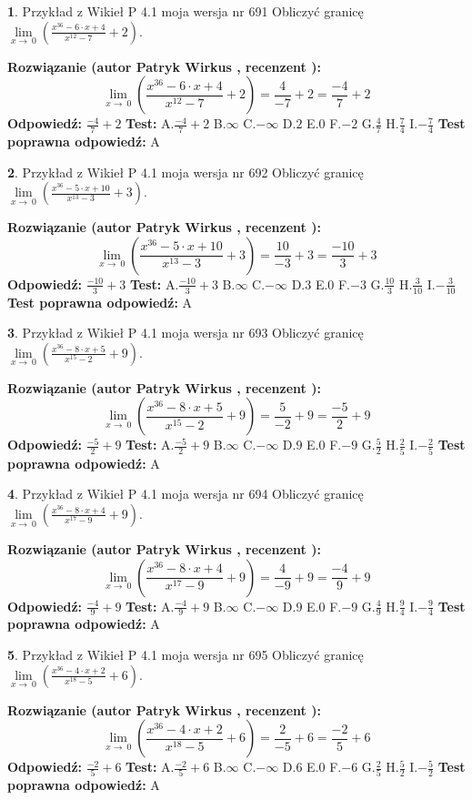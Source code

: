 \documentclass[12pt, a4paper]{article}
\theoremstyle{definition} %
\newtheorem{zad}{}
\newcommand{\zadStart}[1]{\begin{zad}#1\newline}
\newcommand{\zadStop}{\end{zad}}
\newcommand{\rozwStart}[2]{\noindent \textbf{Rozwiązanie (autor #1 , recenzent #2): }\newline}
\newcommand{\rozwStop}{\newline}
\newcommand{\odpStart}{\noindent \textbf{Odpowiedź:}\newline}
\newcommand{\odpStop}{\newline}
\newcommand{\testStart}{\noindent \textbf{Test:}\newline}
\newcommand{\testStop}{\newline}
\newcommand{\kluczStart}{\noindent \textbf{Test poprawna odpowiedź:}\newline}
\newcommand{\kluczStop}{\newline}
\begin{document}
\zadStart{Przykład z Wikieł P 4.1 moja wersja nr 691}
Obliczyć granicę $\lim\limits_{x\to\ 0}(\frac{x^{36}-6 \cdot x +4}{x^{12}-7}+2)$.
\zadStop
\rozwStart{Patryk Wirkus}{}
$$\lim\limits_{x\to\ 0}(\frac{x^{36}-6 \cdot x +4}{x^{12}-7}+2)=\frac{4}{-7}+2=\frac{-4}{7}+2$$
\rozwStop
\odpStart
$\frac{-4}{7}+2$
\odpStop
\testStart
A.$\frac{-4}{7}+2$
B.$\infty$
C.$-\infty$
D.$2$
E.$0$
F.$-2$
G.$\frac{4}{7}$
H.$\frac{7}{4}$
I.$-\frac{7}{4}$
\testStop
\kluczStart
A
\kluczStop



\zadStart{Przykład z Wikieł P 4.1 moja wersja nr 692}
Obliczyć granicę $\lim\limits_{x\to\ 0}(\frac{x^{36}-5 \cdot x +10}{x^{13}-3}+3)$.
\zadStop
\rozwStart{Patryk Wirkus}{}
$$\lim\limits_{x\to\ 0}(\frac{x^{36}-5 \cdot x +10}{x^{13}-3}+3)=\frac{10}{-3}+3=\frac{-10}{3}+3$$
\rozwStop
\odpStart
$\frac{-10}{3}+3$
\odpStop
\testStart
A.$\frac{-10}{3}+3$
B.$\infty$
C.$-\infty$
D.$3$
E.$0$
F.$-3$
G.$\frac{10}{3}$
H.$\frac{3}{10}$
I.$-\frac{3}{10}$
\testStop
\kluczStart
A
\kluczStop



\zadStart{Przykład z Wikieł P 4.1 moja wersja nr 693}
Obliczyć granicę $\lim\limits_{x\to\ 0}(\frac{x^{36}-8 \cdot x +5}{x^{15}-2}+9)$.
\zadStop
\rozwStart{Patryk Wirkus}{}
$$\lim\limits_{x\to\ 0}(\frac{x^{36}-8 \cdot x +5}{x^{15}-2}+9)=\frac{5}{-2}+9=\frac{-5}{2}+9$$
\rozwStop
\odpStart
$\frac{-5}{2}+9$
\odpStop
\testStart
A.$\frac{-5}{2}+9$
B.$\infty$
C.$-\infty$
D.$9$
E.$0$
F.$-9$
G.$\frac{5}{2}$
H.$\frac{2}{5}$
I.$-\frac{2}{5}$
\testStop
\kluczStart
A
\kluczStop



\zadStart{Przykład z Wikieł P 4.1 moja wersja nr 694}
Obliczyć granicę $\lim\limits_{x\to\ 0}(\frac{x^{36}-8 \cdot x +4}{x^{17}-9}+9)$.
\zadStop
\rozwStart{Patryk Wirkus}{}
$$\lim\limits_{x\to\ 0}(\frac{x^{36}-8 \cdot x +4}{x^{17}-9}+9)=\frac{4}{-9}+9=\frac{-4}{9}+9$$
\rozwStop
\odpStart
$\frac{-4}{9}+9$
\odpStop
\testStart
A.$\frac{-4}{9}+9$
B.$\infty$
C.$-\infty$
D.$9$
E.$0$
F.$-9$
G.$\frac{4}{9}$
H.$\frac{9}{4}$
I.$-\frac{9}{4}$
\testStop
\kluczStart
A
\kluczStop



\zadStart{Przykład z Wikieł P 4.1 moja wersja nr 695}
Obliczyć granicę $\lim\limits_{x\to\ 0}(\frac{x^{36}-4 \cdot x +2}{x^{18}-5}+6)$.
\zadStop
\rozwStart{Patryk Wirkus}{}
$$\lim\limits_{x\to\ 0}(\frac{x^{36}-4 \cdot x +2}{x^{18}-5}+6)=\frac{2}{-5}+6=\frac{-2}{5}+6$$
\rozwStop
\odpStart
$\frac{-2}{5}+6$
\odpStop
\testStart
A.$\frac{-2}{5}+6$
B.$\infty$
C.$-\infty$
D.$6$
E.$0$
F.$-6$
G.$\frac{2}{5}$
H.$\frac{5}{2}$
I.$-\frac{5}{2}$
\testStop
\kluczStart
A
\kluczStop
\end{document}
